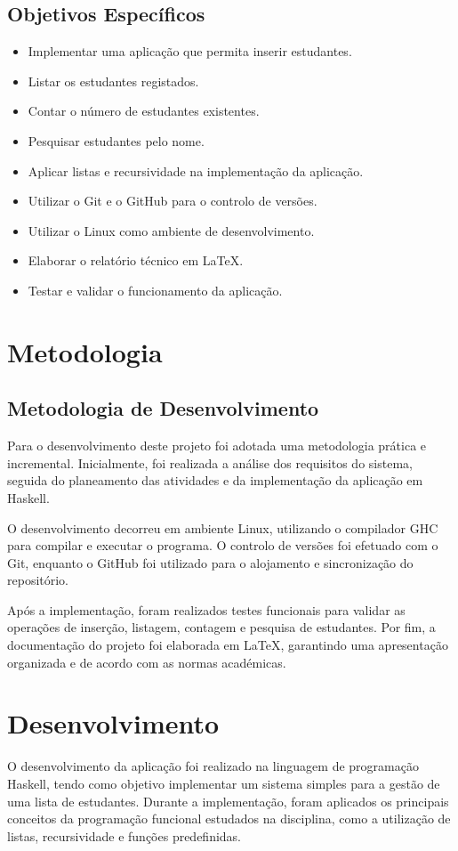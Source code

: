 \documentclass[12pt,a4paper]{article}
\begin{document}
\subsection{Objetivos Específicos}
\begin{itemize}
    \item Implementar uma aplicação que permita inserir estudantes.
    \item Listar os estudantes registados.
    \item Contar o número de estudantes existentes.
    \item Pesquisar estudantes pelo nome.
    \item Aplicar listas e recursividade na implementação da aplicação.
    \item Utilizar o Git e o GitHub para o controlo de versões.
    \item Utilizar o Linux como ambiente de desenvolvimento.
    \item Elaborar o relatório técnico em LaTeX.
    \item Testar e validar o funcionamento da aplicação.
\end{itemize}

\section{Metodologia}

\subsection{Metodologia de Desenvolvimento}
Para o desenvolvimento deste projeto foi adotada uma metodologia prática e incremental. Inicialmente, foi realizada a análise dos requisitos do sistema, seguida do planeamento das atividades e da implementação da aplicação em Haskell.

O desenvolvimento decorreu em ambiente Linux, utilizando o compilador GHC para compilar e executar o programa. O controlo de versões foi efetuado com o Git, enquanto o GitHub foi utilizado para o alojamento e sincronização do repositório.

Após a implementação, foram realizados testes funcionais para validar as operações de inserção, listagem, contagem e pesquisa de estudantes. Por fim, a documentação do projeto foi elaborada em LaTeX, garantindo uma apresentação organizada e de acordo com as normas académicas.

\section{Desenvolvimento}
O desenvolvimento da aplicação foi realizado na linguagem de programação Haskell, tendo como objetivo implementar um sistema simples para a gestão de uma lista de estudantes. Durante a implementação, foram aplicados os principais conceitos da programação funcional estudados na disciplina, como a utilização de listas, recursividade e funções predefinidas.
\end{document}
